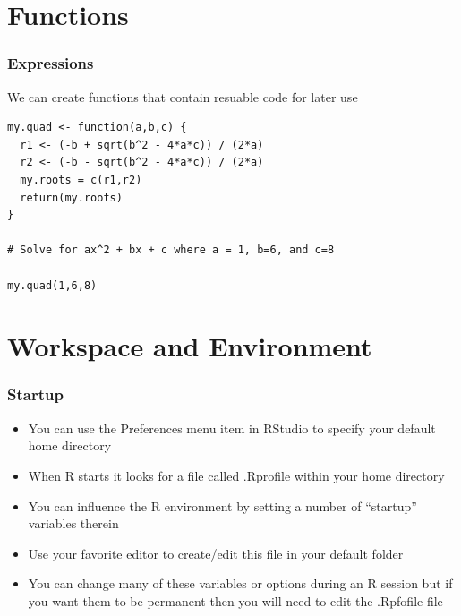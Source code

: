 \documentclass{beamer}
\begin{document}
\section{Functions}

\begin{frame}[fragile]
\frametitle{Expressions}
We can create functions that contain resuable code for later use 
\small

\begin{verbatim}
my.quad <- function(a,b,c) {
  r1 <- (-b + sqrt(b^2 - 4*a*c)) / (2*a)
  r2 <- (-b - sqrt(b^2 - 4*a*c)) / (2*a)
  my.roots = c(r1,r2)
  return(my.roots)
}

# Solve for ax^2 + bx + c where a = 1, b=6, and c=8

my.quad(1,6,8)

\end{verbatim}
\end{frame}


\section{Workspace and Environment}

\begin{frame}[fragile]
\frametitle{Startup}
\begin{itemize}

\item You can use the Preferences menu item in RStudio to specify your default home directory

\item When R starts it looks for a file called .Rprofile within your home directory

\item You can influence the R environment by setting a number of ``startup'' variables therein

\item Use your favorite editor to create/edit this file in your default folder

\item You can change many of these variables or options during an R session but if you want them to 
be permanent then you will need to edit the .Rpfofile file

\end{itemize}

\end{frame}


\end{document}
